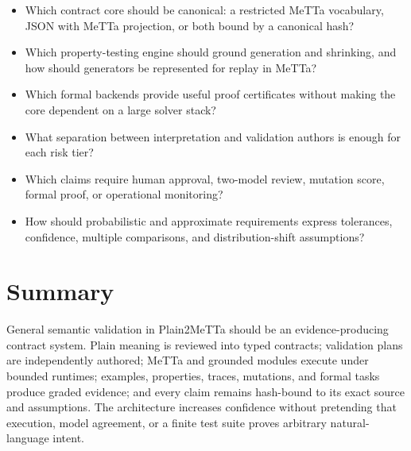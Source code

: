 \documentclass[10pt]{article}
\begin{document}
\begin{itemize}
\item Which contract core should be canonical: a restricted MeTTa vocabulary,
JSON with MeTTa projection, or both bound by a canonical hash?
\item Which property-testing engine should ground generation and shrinking,
and how should generators be represented for replay in MeTTa?
\item Which formal backends provide useful proof certificates without making
the core dependent on a large solver stack?
\item What separation between interpretation and validation authors is enough
for each risk tier?
\item Which claims require human approval, two-model review, mutation score,
formal proof, or operational monitoring?
\item How should probabilistic and approximate requirements express tolerances,
confidence, multiple comparisons, and distribution-shift assumptions?
\end{itemize}

\section{Summary}

General semantic validation in Plain2MeTTa should be an evidence-producing
contract system.  Plain meaning is reviewed into typed contracts; validation
plans are independently authored; MeTTa and grounded modules execute under
bounded runtimes; examples, properties, traces, mutations, and formal tasks
produce graded evidence; and every claim remains hash-bound to its exact source
and assumptions.  The architecture increases confidence without pretending
that execution, model agreement, or a finite test suite proves arbitrary
natural-language intent.
\end{document}

